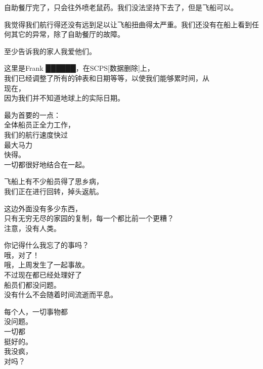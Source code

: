 \hr

\begin{scpbox}


自助餐厅完了，只会往外喷老鼠药。我们没法坚持下去了，但是飞船可以。

我觉得我们航行得还没有远到足以让飞船扭曲得太严重。我们还没有在船上看到任何其它的异常，除了自助餐厅的故障。


至少告诉我的家人我爱他们。


\end{scpbox}

\hr

\begin{scpbox}



这里是Frank ██████，在SCPS{[}数据删除]上，\\
我们已经调整了所有的钟表和日期等等，以使我们能够累时间，从\\
现在，\\
因为我们并不知道地球上的实际日期。

最为首要的一点：\\
全体船员正全力工作，\\
我们的航行速度快过\\
最大马力\\
快得。\\
一切都很好地结合在一起。

飞船上有不少船员得了思乡病，\\
我们正在进行回转，掉头返航。

这边外面没有多少东西，\\
只有无穷无尽的家园的复制，每一个都比前一个更糟？\\
注意，没有人类。

你记得什么我忘了的事吗？\\
哦，对了！\\
哦，上周发生了一起事故。\\
不过现在都已经处理好了\\
船员们都没问题。\\
没有什么不会随着时间流逝而平息。

每个人，一切事物都\\
没问题。\\
一切都\\
挺好的。\\
我没疯，\\
对吗？


\end{scpbox}
